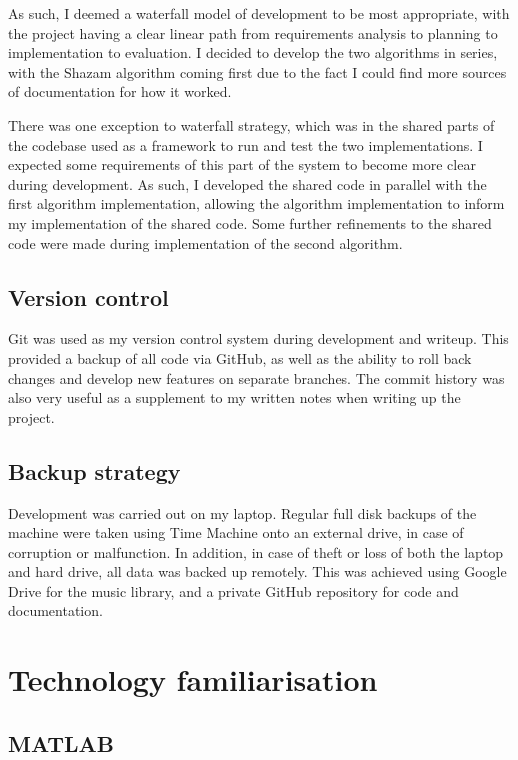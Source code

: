 \documentclass[12pt,a4paper,twoside,openright]{report}
\begin{document}
As such, I deemed a waterfall model of development to be most appropriate, with the project having a clear linear path from requirements analysis to planning to implementation to evaluation. I decided to develop the two algorithms in series, with the Shazam algorithm coming first due to the fact I could find more sources of documentation for how it worked.

There was one exception to waterfall strategy, which was in the shared parts of the codebase used as a framework to run and test the two implementations. I expected some requirements of this part of the system to become more clear during development. As such, I developed the shared code in parallel with the first algorithm implementation, allowing the algorithm implementation to inform my implementation of the shared code. Some further refinements to the shared code were made during implementation of the second algorithm.


\subsection{Version control}

Git was used as my version control system during development and writeup. This provided a backup of all code via GitHub, as well as the ability to roll back changes and develop new features on separate branches. The commit history was also very useful as a supplement to my written notes when writing up the project.


\subsection{Backup strategy}

Development was carried out on my laptop. Regular full disk backups of the machine were taken using Time Machine onto an external drive, in case of corruption or malfunction. In addition, in case of theft or loss of both the laptop and hard drive, all data was backed up remotely. This was achieved using Google Drive for the music library, and a private GitHub repository for code and documentation.




\section{Technology familiarisation}

\subsection{MATLAB}
\end{document}
